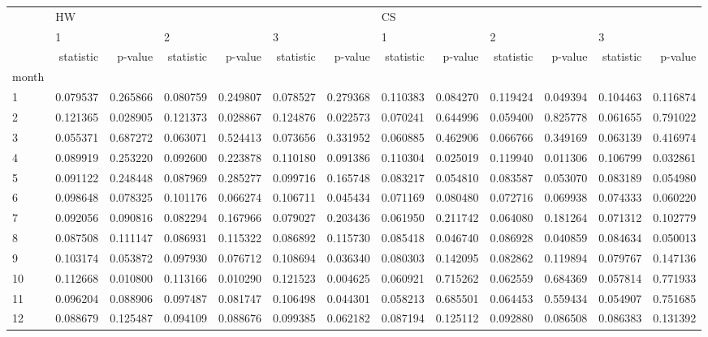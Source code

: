 \begin{tabular}{lrrrrrrrrrrrr}
\toprule
{} & \multicolumn{6}{l}{HW} & \multicolumn{6}{l}{CS} \\
{} & \multicolumn{2}{l}{1} & \multicolumn{2}{l}{2} & \multicolumn{2}{l}{3} & \multicolumn{2}{l}{1} & \multicolumn{2}{l}{2} & \multicolumn{2}{l}{3} \\
{} & statistic &   p-value & statistic &   p-value & statistic &   p-value & statistic &   p-value & statistic &   p-value & statistic &   p-value \\
month &           &           &           &           &           &           &           &           &           &           &           &           \\
\midrule
1     &  0.079537 &  0.265866 &  0.080759 &  0.249807 &  0.078527 &  0.279368 &  0.110383 &  0.084270 &  0.119424 &  0.049394 &  0.104463 &  0.116874 \\
2     &  0.121365 &  0.028905 &  0.121373 &  0.028867 &  0.124876 &  0.022573 &  0.070241 &  0.644996 &  0.059400 &  0.825778 &  0.061655 &  0.791022 \\
3     &  0.055371 &  0.687272 &  0.063071 &  0.524413 &  0.073656 &  0.331952 &  0.060885 &  0.462906 &  0.066766 &  0.349169 &  0.063139 &  0.416974 \\
4     &  0.089919 &  0.253220 &  0.092600 &  0.223878 &  0.110180 &  0.091386 &  0.110304 &  0.025019 &  0.119940 &  0.011306 &  0.106799 &  0.032861 \\
5     &  0.091122 &  0.248448 &  0.087969 &  0.285277 &  0.099716 &  0.165748 &  0.083217 &  0.054810 &  0.083587 &  0.053070 &  0.083189 &  0.054980 \\
6     &  0.098648 &  0.078325 &  0.101176 &  0.066274 &  0.106711 &  0.045434 &  0.071169 &  0.080480 &  0.072716 &  0.069938 &  0.074333 &  0.060220 \\
7     &  0.092056 &  0.090816 &  0.082294 &  0.167966 &  0.079027 &  0.203436 &  0.061950 &  0.211742 &  0.064080 &  0.181264 &  0.071312 &  0.102779 \\
8     &  0.087508 &  0.111147 &  0.086931 &  0.115322 &  0.086892 &  0.115730 &  0.085418 &  0.046740 &  0.086928 &  0.040859 &  0.084634 &  0.050013 \\
9     &  0.103174 &  0.053872 &  0.097930 &  0.076712 &  0.108694 &  0.036340 &  0.080303 &  0.142095 &  0.082862 &  0.119894 &  0.079767 &  0.147136 \\
10    &  0.112668 &  0.010800 &  0.113166 &  0.010290 &  0.121523 &  0.004625 &  0.060921 &  0.715262 &  0.062559 &  0.684369 &  0.057814 &  0.771933 \\
11    &  0.096204 &  0.088906 &  0.097487 &  0.081747 &  0.106498 &  0.044301 &  0.058213 &  0.685501 &  0.064453 &  0.559434 &  0.054907 &  0.751685 \\
12    &  0.088679 &  0.125487 &  0.094109 &  0.088676 &  0.099385 &  0.062182 &  0.087194 &  0.125112 &  0.092880 &  0.086508 &  0.086383 &  0.131392 \\
\bottomrule
\end{tabular}
